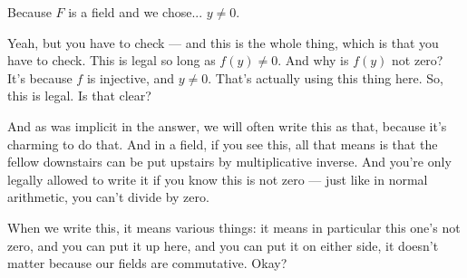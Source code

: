 \begin{student}
Because $F$ is a field and we chose... $y \ne 0$.
\end{student}

\begin{speech}[00:21:58 - 00:23:11]
Yeah, but you have to check --- and this is the whole thing, which is that you have to check. This is legal so long as $f(y) \neq 0$.  And why is $f(y)$ not zero? It's because $f$ is injective, and $y \neq 0$.  That's actually using this thing here. So, this is legal. Is that clear?

And as was implicit in the answer, we will often write this as that,  because it's charming to do that. And in a field, if you see this, all that means is that the fellow downstairs can be put upstairs by multiplicative inverse. And you're only legally allowed to write it if you know this is not zero --- just like in normal arithmetic, you can't divide by zero.

When we write this, it means various things: it means in particular this one's not zero, and you can put it up here, and you can put it on either side, it doesn't matter because our fields are commutative. Okay?
\end{speech}

